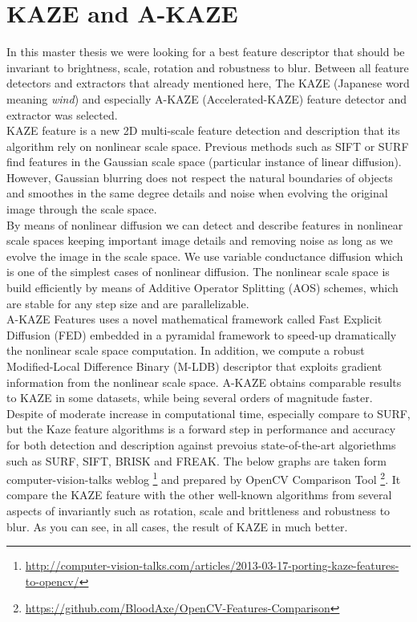 \section {KAZE and A-KAZE}
In this master thesis we were looking for a best feature descriptor that should be invariant to brightness, scale, rotation and robustness to blur. Between all feature detectors and extractors that already mentioned here, The KAZE (Japanese word meaning \emph{wind}) and especially A-KAZE (Accelerated-KAZE) feature detector and extractor was selected.\\
KAZE \cite{alcantarilla2012kaze} feature is a new 2D multi-scale feature detection and description that its algorithm rely on nonlinear scale space. Previous methods such as SIFT or SURF find features in the Gaussian scale space (particular instance of linear diffusion). However, Gaussian blurring does not respect the natural boundaries of objects and smoothes in the same degree details and noise when evolving the original image through the scale space.\\
By means of nonlinear diffusion we can detect and describe features in nonlinear scale spaces keeping important image details and removing noise as long as we evolve the image in the scale space. We use variable conductance diffusion which is one of the simplest cases of nonlinear diffusion. The nonlinear scale space is build efficiently by means of Additive Operator Splitting (AOS) schemes, which are stable for any step size and are parallelizable.\\
A-KAZE \cite{alcantarilla2011fast} Features uses a novel mathematical framework called Fast Explicit Diffusion (FED) embedded in a pyramidal framework to speed-up dramatically the nonlinear scale space computation. In addition, we compute a robust Modified-Local Difference Binary (M-LDB) descriptor that exploits gradient information from the nonlinear scale space. A-KAZE obtains comparable results to KAZE in some datasets, while being several orders of magnitude faster.\\
Despite of moderate increase in computational time, especially compare to SURF, but the Kaze feature algorithms is a forward step in performance and accuracy for both detection and description against prevoius state-of-the-art algoriethms such as SURF, SIFT, BRISK and FREAK.
The below graphs are taken form computer-vision-talks weblog \footnote{\url{http://computer-vision-talks.com/articles/2013-03-17-porting-kaze-features-to-opencv/}} and prepared by OpenCV Comparison Tool \footnote{\url{https://github.com/BloodAxe/OpenCV-Features-Comparison}}. It compare the KAZE feature with the other well-known algorithms from several aspects of invariantly such as rotation, scale and brittleness and robustness to blur. As you can see, in all cases, the result of KAZE in much better.

